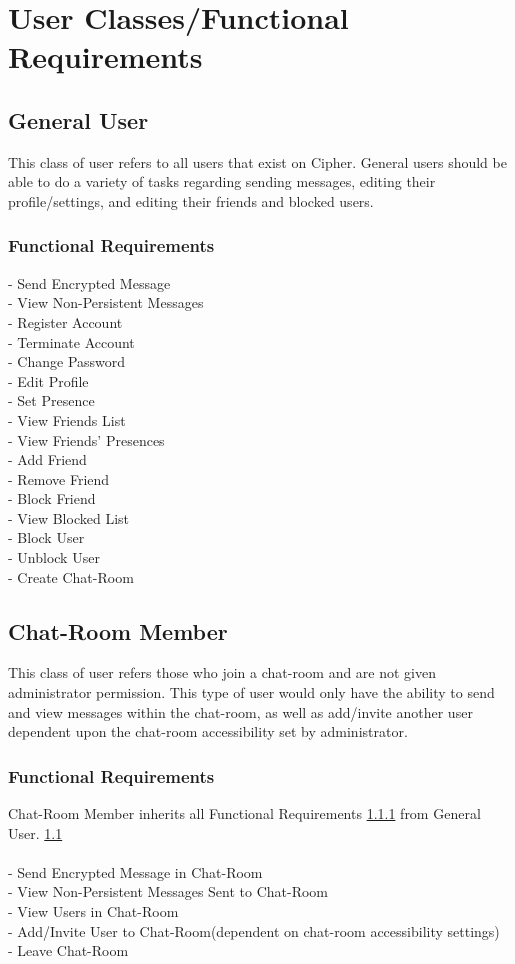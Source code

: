 \documentclass[11pt]{article}
\theoremstyle{plain}
\theoremstyle{definition}
\begin{document}
\section{User Classes/Functional Requirements}\label{sec:userclasses}

\subsection{General User}\label{sec:genuser}
This class of user refers to all users that exist on Cipher. General users should be able to do a variety of tasks regarding sending messages, editing their profile/settings, and editing their friends and blocked users.
\subsubsection{Functional Requirements}\label{sec:genfuncreq}
- Send Encrypted Message\\
- View Non-Persistent Messages\\
- Register Account\\
- Terminate Account\\
- Change Password\\
- Edit Profile\\
- Set Presence\\
- View Friends List\\
- View Friends' Presences\\
- Add Friend\\
- Remove Friend\\
- Block Friend\\
- View Blocked List\\
- Block User\\
- Unblock User\\
- Create Chat-Room

\subsection{Chat-Room Member}\label{sec:chatmem}
This class of user refers those who join a chat-room and are not given administrator permission. This type of user would only have the ability to send and view messages within the chat-room, as well as add/invite another user dependent upon the chat-room accessibility set by administrator.
\subsubsection{Functional Requirements}\label{sec:chatfuncreq}
Chat-Room Member inherits all Functional Requirements \ref{sec:genfuncreq} from General User. \ref{sec:genuser}\\\\
- Send Encrypted Message in Chat-Room\\
- View Non-Persistent Messages Sent to Chat-Room\\
- View Users in Chat-Room\\
- Add/Invite User to Chat-Room(dependent on chat-room accessibility settings)\\
- Leave Chat-Room
\end{document}
